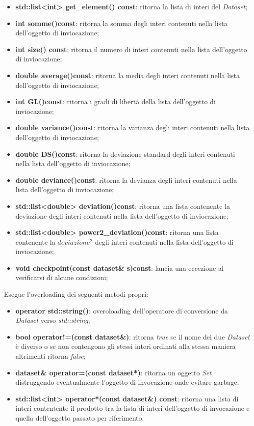 \documentclass[a4paper,10pt]{article}
\begin{document}
    \begin{itemize}
        \item \textbf{std::list<int> get\_element() const}: ritorna la lista di interi del \textit{Dataset};
        \item \textbf{int somme()const}: ritorna la somma degli interi contenuti nella lista dell'oggetto di inviocazione;
        \item \textbf{int size() const}: ritorna il numero di interi contenuti nella lista dell'oggetto di inviocazione;
        \item \textbf{double average()const}: ritorna la media degli interi contenuti nella lista dell'oggetto di inviocazione;
        \item \textbf{int GL()const}: ritorna i gradi di libertà della lista dell'oggetto di inviocazione;
        \item \textbf{double variance()const}: ritorna la varianza degli interi contenuti nella lista dell'oggetto di inviocazione;
        \item \textbf{double DS()const}: ritorna la deviazione standard degli interi contenuti nella lista dell'oggetto di inviocazione;
        \item \textbf{double deviance()const}: ritorna la devianza degli interi contenuti nella lista dell'oggetto di inviocazione;
        \item \textbf{std::list<double> deviation()const}: ritorna una lista contenente la deviazione degli interi contenuti nella lista dell'oggetto di inviocazione;
        \item \textbf{std::list<double> power2\_deviation()const}: ritorna una lista contenente la $deviazione^{2}$ degli interi contenuti nella lista dell'oggetto di inviocazione;
        \item \textbf{void checkpoint(const dataset\& s)const}: lancia una eccezione al verificarsi di alcune condizioni;
    \end{itemize}
    Esegue l'overloading dei seguenti metodi propri:
    \begin{itemize}
        \item \textbf{operator std::string()}: overoloading dell'operatore di conversione da \textit{Dataset} verso \textit{std::string};
        \item \textbf{bool operator!=(const dataset\&)}: ritorna \textit{true} se il nome dei due \textit{Dataset} è diverso o se non contengono gli stessi interi ordinati alla stessa maniera altrimenti ritorna \textit{false};
        \item \textbf{dataset\& operator=(const dataset*)}: ritorna un oggetto \textit{Set} distruggendo eventualmente l'oggetto di invocazione onde evitare garbage;
        \item \textbf{std::list<int> operator*(const dataset\&) const}: ritorna una lista di interi contentente il prodotto tra la lista di interi dell'oggetto di invocazione e quella dell'oggetto passato per riferimento.
    \end{itemize}
\end{document}
